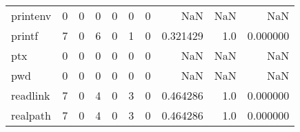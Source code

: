 \begin{tabular}{lrrrrrrrrr}
printenv  &                                                  0 &                                                  0 &                                                  0 &                                                  0 &                                                  0 &                                                  0 &                                                NaN &                                    NaN &                                  NaN \\
printf    &                                                  7 &                                                  0 &                                                  6 &                                                  0 &                                                  1 &                                                  0 &                                           0.321429 &                                    1.0 &                             0.000000 \\
ptx       &                                                  0 &                                                  0 &                                                  0 &                                                  0 &                                                  0 &                                                  0 &                                                NaN &                                    NaN &                                  NaN \\
pwd       &                                                  0 &                                                  0 &                                                  0 &                                                  0 &                                                  0 &                                                  0 &                                                NaN &                                    NaN &                                  NaN \\
readlink  &                                                  7 &                                                  0 &                                                  4 &                                                  0 &                                                  3 &                                                  0 &                                           0.464286 &                                    1.0 &                             0.000000 \\
realpath  &                                                  7 &                                                  0 &                                                  4 &                                                  0 &                                                  3 &                                                  0 &                                           0.464286 &                                    1.0 &                             0.000000 \\

\end{tabular}
